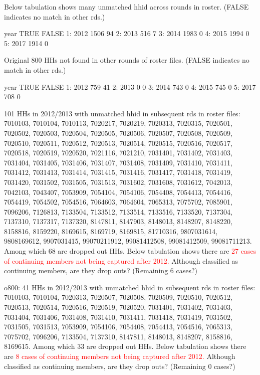 Below tabulation shows many unmatched \textsf{hhid} across rounds in roster. (FALSE indicates no match in other rds.)
\begin{Schunk}
\begin{Soutput}
   year TRUE FALSE
1: 2012 1506    94
2: 2013  516     7
3: 2014 1983     0
4: 2015 1994     0
5: 2017 1914     0
\end{Soutput}
\end{Schunk}
Original 800 HHs not found in other rounds of roster files. (FALSE indicates no match in other rds.)
\begin{Schunk}
\begin{Soutput}
   year TRUE FALSE
1: 2012  759    41
2: 2013    0     0
3: 2014  743     0
4: 2015  745     0
5: 2017  708     0
\end{Soutput}
\end{Schunk}
101 HHs in 2012/2013 with unmatched hhid in subsequent rds in roster files: {\footnotesize 7010103, 7010104, 7010113, 7020217, 7020219, 7020313, 7020315, 7020501, 7020502, 7020503, 7020504, 7020505, 7020506, 7020507, 7020508, 7020509, 7020510, 7020511, 7020512, 7020513, 7020514, 7020515, 7020516, 7020517, 7020518, 7020519, 7020520, 7021116, 7021210, 7031401, 7031402, 7031403, 7031404, 7031405, 7031406, 7031407, 7031408, 7031409, 7031410, 7031411, 7031412, 7031413, 7031414, 7031415, 7031416, 7031417, 7031418, 7031419, 7031420, 7031502, 7031505, 7031513, 7031602, 7031608, 7031612, 7042013, 7042103, 7043407, 7053909, 7054104, 7054106, 7054408, 7054413, 7054416, 7054419, 7054502, 7054516, 7064603, 7064604, 7065313, 7075702, 7085901, 7096206, 7126813, 7133504, 7133512, 7133514, 7133516, 7133520, 7137304, 7137310, 7137317, 7137320, 8147811, 8147903, 8148013, 8148207, 8148220, 8158816, 8159220, 8169615, 8169719, 8169815, 81710316, 9807031614, 9808169612, 9907031415, 99070211912, 99081412508, 99081412509, 99081711213}. Among which 68 are dropped out HHs. Below tabulation shows there are \textcolor{red}{27 cases of continuing members not being captured after 2012.} Although classified as continuing members, are they drop outs? (Remaining 6 cases?)

\textsf{o800}: 41 HHs in 2012/2013 with unmatched hhid in subsequent rds in roster files: {\footnotesize 7010103, 7010104, 7020313, 7020507, 7020508, 7020509, 7020510, 7020512, 7020513, 7020514, 7020516, 7020519, 7020520, 7031401, 7031402, 7031403, 7031404, 7031406, 7031408, 7031410, 7031411, 7031418, 7031419, 7031502, 7031505, 7031513, 7053909, 7054106, 7054408, 7054413, 7054516, 7065313, 7075702, 7096206, 7133504, 7137310, 8147811, 8148013, 8148207, 8158816, 8169615}. Among which 33 are dropped out HHs. Below tabulation shows there are \textcolor{red}{8 cases of continuing members not being captured after 2012.} Although classified as continuing members, are they drop outs? (Remaining 0 cases?)


